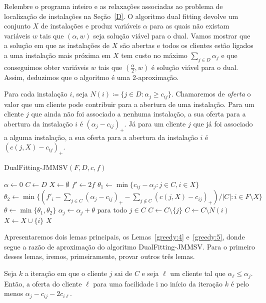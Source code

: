 Relembre o programa inteiro e as relaxações associadas ao problema de localização de instalações na Seção~\ref{D}. 
O algoritmo dual fitting devolve um conjunto $X$ de instalações e produz variáveis $\alpha$ para as quais não existam variáveis $w$ tais que $(\alpha,w)$ seja solução viável para o dual. 
Vamos mostrar que a solução em que as instalações de $X$ são abertas e todos os clientes estão ligados a uma instalação mais próxima em $X$ tem custo no máximo $\sum_{j \in D} \alpha_j$ e que conseguimos obter variáveis $w$ tais que $(\frac{\alpha}{2},w)$ é solução viável para o dual. 
Assim, deduzimos que o algoritmo é uma 2-aproximação.

Para cada instalação $i$, seja $N(i) \coloneqq \{j \in D: \alpha_j \geq c_{ij}\}$. Chamaremos de \emph{oferta} o valor que um cliente pode contribuir para a abertura de uma instalação. Para um cliente $j$ que ainda não foi associado a nenhuma instalação, a sua oferta para a abertura da instalação $i$ é $(\alpha_j - c_{ij})_+$. Já para um cliente $j$ que já foi associado a alguma instalação, a sua oferta para a abertura da instalação $i$ é $(c(j,X) - c_{ij})_+$.

\begin{algorithm}
    \caption{\sc DualFitting-JMMSV$(F,D,c,f)$}
    \begin{algorithmic}[1]
    \State $\alpha \gets 0$
    \State $C \gets D$
    \State $X \gets \emptyset$
    \State $f' \gets 2f$
    \State $\theta_1 \gets \min\{c_{ij} - \alpha_j:j \in C,i\in X\}$
    \State $\theta_2 \gets \min\{(f'_i - \sum_{j \in C}(\alpha_j - c_{ij})_+ - \sum_{j \not \in C}(c(j,X) - c_{ij})_+)/|C|: i \in F \setminus X\}$
    \State $\theta \gets \min\{\theta_1,\theta_2\}$
    \State $\alpha_j \gets \alpha_j + \theta$ para todo $j \in C$
    \State $C \gets C \setminus \{j\}$
    \EndIf
    \State $C \gets C\setminus N(i)$
    \State $X \gets X \cup \{i\}$
    \EndIf
    \EndWhile
    \State \Return $X$
    \end{algorithmic}
\end{algorithm}
Apresentaremos dois lemas principais, os Lemas~\ref{greedy:4} e~\ref{greedy:5}, donde segue a razão de aproximação do algoritmo {\sc DualFitting-JMMSV}.
Para o primeiro desses lemas, iremos, primeiramente, provar outros três lemas.

\begin{lemma}
    \label{upbound_bid}
    Seja $k$ a iteração em que o cliente $j$ sai de $C$ e seja $\ell$ um cliente tal que $\alpha_\ell \leq \alpha_j$. Então, a oferta do cliente $\ell$ para uma facilidade i no início da iteração $k$ é pelo menos $\alpha_j - c_{ij} - 2c_{i\ell}$.
\end{lemma}

